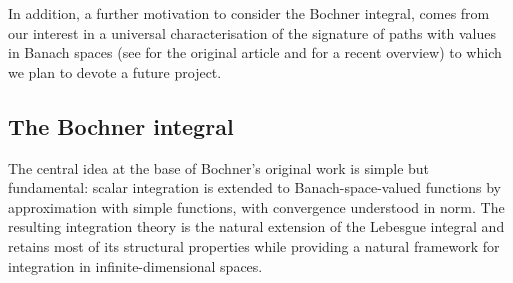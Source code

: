 \documentclass{amsart}
\theoremstyle{definition}
\theoremstyle{plain}
\begin{document}
    In addition, a further motivation to consider the Bochner integral, comes from our interest in a universal characterisation of the signature of paths with values in Banach spaces (see \cite{Chen1957} for the original article and \cite{Chevyrev/Kormilitzin2016} for a recent overview) to which we plan to devote a future project.


    \subsection{The Bochner integral}

        The central idea at the base of Bochner's original work \cite{Bochner1933} is simple but fundamental: scalar integration is extended to Banach-space-valued functions by approximation with simple functions, with convergence understood in norm. 
        The resulting integration theory is the natural extension of the Lebesgue integral and retains most of its structural properties while providing a natural framework for integration in infinite-dimensional spaces.
\end{document}

